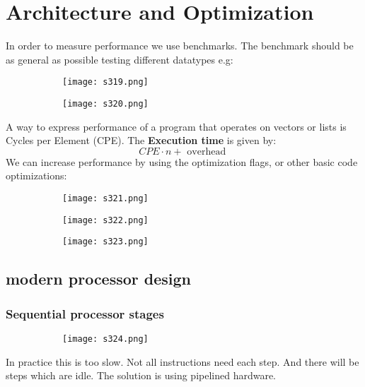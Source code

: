 \documentclass[8pt]{extreport}
\begin{document}
\chapter{Architecture and Optimization}

In order to measure performance we use benchmarks. The benchmark should be as general as possible testing different datatypes e.g:

\begin{figure}[H]
\begin{subfigure}[b]{0.4\linewidth}
\texttt{[image: s319.png]}
\end{subfigure}
\begin{subfigure}[b]{0.4\linewidth}
\texttt{[image: s320.png]}
\end{subfigure}
\end{figure}

A way to express performance of a program that operates on vectors or lists is Cycles per Element (CPE). The \textbf{Execution time} is given by:
$$ CPE \cdot n + \text{ overhead }$$
We can increase performance by using the optimization flags, or other basic code optimizations:
\begin{figure}[H]
\begin{subfigure}[b]{0.4\linewidth}
\texttt{[image: s321.png]}
\end{subfigure}
\begin{subfigure}[b]{0.4\linewidth}
\texttt{[image: s322.png]}
\end{subfigure}
\begin{subfigure}[b]{0.4\linewidth}
\texttt{[image: s323.png]}
\end{subfigure}
\end{figure}

\section{modern processor design}

\subsection{Sequential processor stages}
\begin{figure}[H]
\begin{subfigure}[b]{0.4\linewidth}
\texttt{[image: s324.png]}
\end{subfigure}
\end{figure}
In practice this is too slow. Not all instructions need each step. And there will be steps which are idle. The solution is using pipelined hardware.
\end{document}
